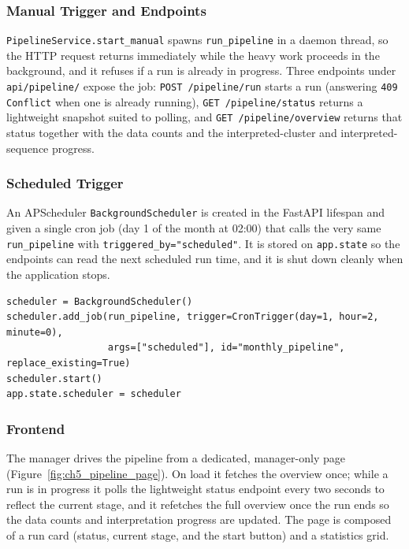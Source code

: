 \subsubsection*{Manual Trigger and Endpoints}

\texttt{PipelineService.start\_manual} spawns \texttt{run\_pipeline} in a daemon thread, so the HTTP request returns immediately while the heavy work proceeds in the background, and it refuses if a run is already in progress. Three endpoints under \texttt{api/pipeline/} expose the job: \texttt{POST /pipeline/run} starts a run (answering \texttt{409 Conflict} when one is already running), \texttt{GET /pipeline/status} returns a lightweight snapshot suited to polling, and \texttt{GET /pipeline/overview} returns that status together with the data counts and the interpreted-cluster and interpreted-sequence progress.

\subsubsection*{Scheduled Trigger}

An APScheduler \texttt{BackgroundScheduler} is created in the FastAPI lifespan and given a single cron job (day 1 of the month at 02:00) that calls the very same \texttt{run\_pipeline} with \texttt{triggered\_by="scheduled"}. It is stored on \texttt{app.state} so the endpoints can read the next scheduled run time, and it is shut down cleanly when the application stops.

\begin{lstlisting}[style=pythonstyle]
scheduler = BackgroundScheduler()
scheduler.add_job(run_pipeline, trigger=CronTrigger(day=1, hour=2, minute=0),
                  args=["scheduled"], id="monthly_pipeline", replace_existing=True)
scheduler.start()
app.state.scheduler = scheduler
\end{lstlisting}

\subsubsection*{Frontend}

The manager drives the pipeline from a dedicated, manager-only page (Figure~\ref{fig:ch5_pipeline_page}). On load it fetches the overview once; while a run is in progress it polls the lightweight status endpoint every two seconds to reflect the current stage, and it refetches the full overview once the run ends so the data counts and interpretation progress are updated. The page is composed of a run card (status, current stage, and the start button) and a statistics grid.

